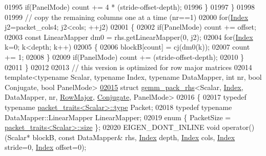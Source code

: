 \begin{DoxyCode}
{01995       \textcolor{keywordflow}{if}(PanelMode) count += 4 * (stride-offset-depth);
01996     \}
01997   \}
01998 
01999   \textcolor{comment}{// copy the remaining columns one at a time (nr==1)}
02000   \textcolor{keywordflow}{for}(\hyperlink{namespace_eigen_a62e77e0933482dafde8fe197d9a2cfde}{Index} j2=packet\_cols4; j2<cols; ++j2)
02001   \{
02002     \textcolor{keywordflow}{if}(PanelMode) count += offset;
02003     \textcolor{keyword}{const} LinearMapper dm0 = rhs.getLinearMapper(0, j2);
02004     \textcolor{keywordflow}{for}(\hyperlink{namespace_eigen_a62e77e0933482dafde8fe197d9a2cfde}{Index} k=0; k<depth; k++)
02005     \{
02006       blockB[count] = cj(dm0(k));
02007       count += 1;
02008     \}
02009     \textcolor{keywordflow}{if}(PanelMode) count += (stride-offset-depth);
02010   \}
02011 \}
02012 
02013 \textcolor{comment}{// this version is optimized for row major matrices}
02014 \textcolor{keyword}{template}<\textcolor{keyword}{typename} Scalar, \textcolor{keyword}{typename} Index, \textcolor{keyword}{typename} DataMapper, \textcolor{keywordtype}{int} nr, \textcolor{keywordtype}{bool} Conjugate, \textcolor{keywordtype}{bool} PanelMode>
\hyperlink{struct_eigen_1_1internal_1_1gemm__pack__rhs_3_01_scalar_00_01_index_00_01_data_mapper_00_01nr_00b7f2442d9ba6129104d4662213736528}{02015} \textcolor{keyword}{struct }\hyperlink{struct_eigen_1_1internal_1_1gemm__pack__rhs}{gemm\_pack\_rhs}<Scalar, \hyperlink{namespace_eigen_a62e77e0933482dafde8fe197d9a2cfde}{Index}, DataMapper, nr, \hyperlink{group__enums_ggaacded1a18ae58b0f554751f6cdf9eb13acfcde9cd8677c5f7caf6bd603666aae3}{RowMajor}, 
      \hyperlink{class_eigen_1_1_conjugate}{Conjugate}, PanelMode>
02016 \{
02017   \textcolor{keyword}{typedef} \textcolor{keyword}{typename} \hyperlink{struct_eigen_1_1internal_1_1packet__traits}{packet\_traits<Scalar>::type} Packet;
02018   \textcolor{keyword}{typedef} \textcolor{keyword}{typename} DataMapper::LinearMapper LinearMapper;
02019   \textcolor{keyword}{enum} \{ PacketSize = \hyperlink{struct_eigen_1_1internal_1_1packet__traits}{packet\_traits<Scalar>::size} \};
02020   EIGEN\_DONT\_INLINE \textcolor{keywordtype}{void} operator()(Scalar* blockB, \textcolor{keyword}{const} DataMapper& rhs, \hyperlink{namespace_eigen_a62e77e0933482dafde8fe197d9a2cfde}{Index} depth, 
      \hyperlink{namespace_eigen_a62e77e0933482dafde8fe197d9a2cfde}{Index} cols, \hyperlink{namespace_eigen_a62e77e0933482dafde8fe197d9a2cfde}{Index} stride=0, \hyperlink{namespace_eigen_a62e77e0933482dafde8fe197d9a2cfde}{Index} offset=0);
}
\end{DoxyCode}
